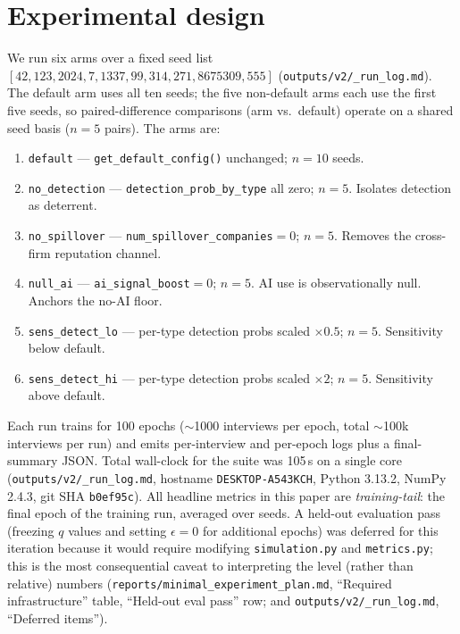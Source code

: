 \documentclass[11pt]{article}
\begin{document}
\section{Experimental design}\label{sec:design}

We run six arms over a fixed seed list
\([42, 123, 2024, 7, 1337, 99, 314, 271, 8675309, 555]\)
(\texttt{outputs/v2/\_run\_log.md}). The default arm uses all ten seeds; the
five non-default arms each use the first five seeds, so paired-difference
comparisons (arm vs.\ default) operate on a shared seed basis (\(n=5\) pairs).
The arms are:

\begin{enumerate}
  \item \texttt{default} --- \texttt{get\_default\_config()} unchanged;
        \(n=10\) seeds.
  \item \texttt{no\_detection} --- \texttt{detection\_prob\_by\_type} all zero;
        \(n=5\). Isolates detection as deterrent.
  \item \texttt{no\_spillover} --- \texttt{num\_spillover\_companies}\(=0\);
        \(n=5\). Removes the cross-firm reputation channel.
  \item \texttt{null\_ai} --- \texttt{ai\_signal\_boost}\(=0\); \(n=5\).
        AI use is observationally null. Anchors the no-AI floor.
  \item \texttt{sens\_detect\_lo} --- per-type detection probs scaled \(\times 0.5\);
        \(n=5\). Sensitivity below default.
  \item \texttt{sens\_detect\_hi} --- per-type detection probs scaled \(\times 2\);
        \(n=5\). Sensitivity above default.
\end{enumerate}

Each run trains for 100 epochs (\(\sim\)1000 interviews per epoch, total
\(\sim\)100k interviews per run) and emits per-interview and per-epoch logs
plus a final-summary JSON. Total wall-clock for the suite was 105\,s on a
single core (\texttt{outputs/v2/\_run\_log.md}, hostname
\texttt{DESKTOP-A543KCH}, Python 3.13.2, NumPy 2.4.3,
git SHA \texttt{b0ef95c}).
All headline metrics in this paper are \emph{training-tail}: the final epoch
of the training run, averaged over seeds. A held-out evaluation pass
(freezing \(q\) values and setting \(\epsilon=0\) for additional epochs)
was deferred for this iteration because it would require modifying
\texttt{simulation.py} and \texttt{metrics.py}; this is the most consequential
caveat to interpreting the level (rather than relative) numbers
(\texttt{reports/minimal\_experiment\_plan.md}, ``Required infrastructure''
table, ``Held-out eval pass'' row; and \texttt{outputs/v2/\_run\_log.md},
``Deferred items'').
\end{document}

